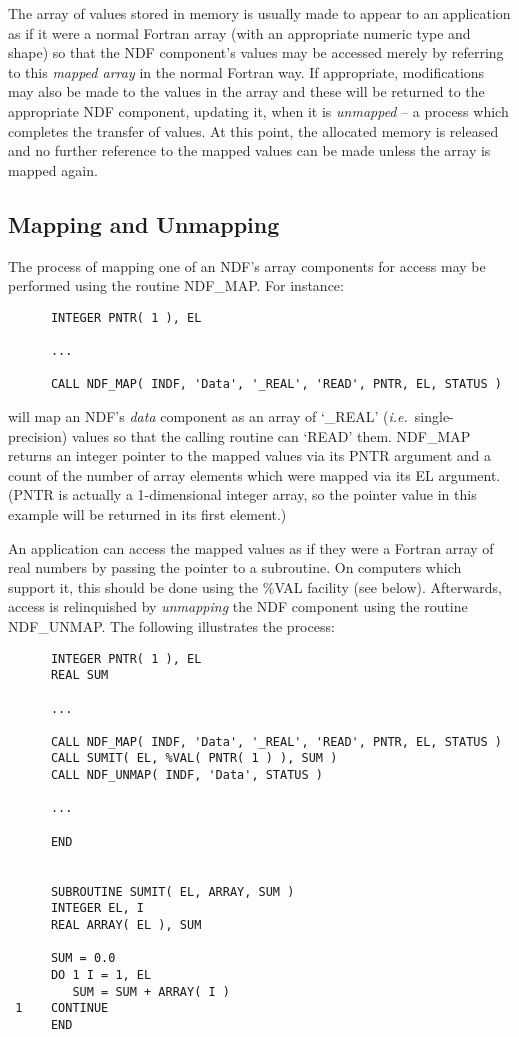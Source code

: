 \documentclass[twoside,11pt]{article}
\newcommand{\htmlref}[2]{#1}
\newcommand{\xlabel}[1]{}
\newcommand{\st}[1]{{\em{#1}}}
\begin{document}
The array of values stored in memory is usually made to appear to an
application as if it were a normal Fortran array (with an appropriate
numeric type and shape) so that the NDF component's values may be accessed
merely by referring to this \st{mapped array\/} in the normal Fortran way. If
appropriate, modifications may also be made to the values in the array and
these will be returned to the appropriate NDF component, updating it, when
it is \st{unmapped\/} -- a process which completes the transfer of values. At
this point, the allocated memory is released and no further reference to
the mapped values can be made unless the array is mapped again. 

\subsection{\xlabel{mapping_and_unmapping}\label{ss:map}Mapping and Unmapping}

The process of mapping one of an NDF's array components for access may be
performed using the routine \htmlref{NDF\_MAP}{NDF_MAP}. 
For instance:

\small
\begin{verbatim}
      INTEGER PNTR( 1 ), EL

      ...

      CALL NDF_MAP( INDF, 'Data', '_REAL', 'READ', PNTR, EL, STATUS )
\end{verbatim}
\normalsize

will map an NDF's \st{data\/} component as an array of `\_REAL' (\st{i.e.}\ 
single-precision) values so that the calling routine can `READ' them. 
NDF\_MAP returns an integer pointer to the mapped values via its PNTR
argument and a count of the number of array elements which were mapped via
its EL argument. 
(PNTR is actually a 1-dimensional integer array, so the pointer value in
this example will be returned in its first element.) 

An application can access the mapped values as if they were a Fortran
array of real numbers by passing the pointer to a subroutine.  On
computers which support it, this should be done using the \%VAL
facility (see below).  Afterwards, access is relinquished by
\st{unmapping\/} the NDF component using the routine
\htmlref{NDF\_UNMAP}{NDF_UNMAP}.  The 
following illustrates the process:

\small
\begin{verbatim}
      INTEGER PNTR( 1 ), EL
      REAL SUM

      ...

      CALL NDF_MAP( INDF, 'Data', '_REAL', 'READ', PNTR, EL, STATUS )
      CALL SUMIT( EL, %VAL( PNTR( 1 ) ), SUM )
      CALL NDF_UNMAP( INDF, 'Data', STATUS )

      ...

      END


      SUBROUTINE SUMIT( EL, ARRAY, SUM )
      INTEGER EL, I
      REAL ARRAY( EL ), SUM

      SUM = 0.0
      DO 1 I = 1, EL
         SUM = SUM + ARRAY( I )
 1    CONTINUE
      END
\end{verbatim}
\normalsize
\end{document}
